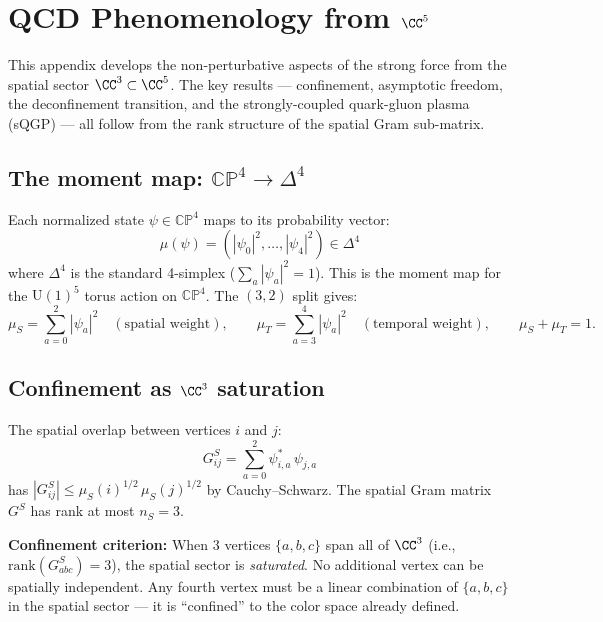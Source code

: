 \section{QCD Phenomenology from $\CC^5$}
\label{app:qcd}

This appendix develops the non-perturbative aspects of the strong force from the spatial sector $\CC^3 \subset \CC^5$. The key results --- confinement, asymptotic freedom, the deconfinement transition, and the strongly-coupled quark-gluon plasma (sQGP) --- all follow from the rank structure of the spatial Gram sub-matrix.

\subsection{The moment map: $\mathbb{CP}^4 \to \Delta^4$}

Each normalized state $\psi \in \mathbb{CP}^4$ maps to its probability vector:
\begin{equation}
\mu(\psi) = (|\psi_0|^2, \ldots, |\psi_4|^2) \in \Delta^4
\end{equation}
where $\Delta^4$ is the standard 4-simplex ($\sum_a |\psi_a|^2 = 1$). This is the moment map for the $\text{U}(1)^5$ torus action on $\mathbb{CP}^4$. The $(3,2)$ split gives:
\begin{equation}
\mu_S = \sum_{a=0}^{2}|\psi_a|^2 \quad (\text{spatial weight}), \qquad \mu_T = \sum_{a=3}^{4}|\psi_a|^2 \quad (\text{temporal weight}), \qquad \mu_S + \mu_T = 1.
\end{equation}

\subsection{Confinement as $\CC^3$ saturation}

The spatial overlap between vertices $i$ and $j$:
\begin{equation}
G^S_{ij} = \sum_{a=0}^{2} \psi^*_{i,a}\,\psi_{j,a}
\end{equation}
has $|G^S_{ij}| \leq \mu_S(i)^{1/2}\,\mu_S(j)^{1/2}$ by Cauchy--Schwarz. The spatial Gram matrix $G^S$ has rank at most $n_S = 3$.

\textbf{Confinement criterion:} When 3 vertices $\{a, b, c\}$ span all of $\CC^3$ (i.e., $\text{rank}(G^S_{abc}) = 3$), the spatial sector is \emph{saturated}. No additional vertex can be spatially independent. Any fourth vertex must be a linear combination of $\{a, b, c\}$ in the spatial sector --- it is ``confined'' to the color space already defined.

